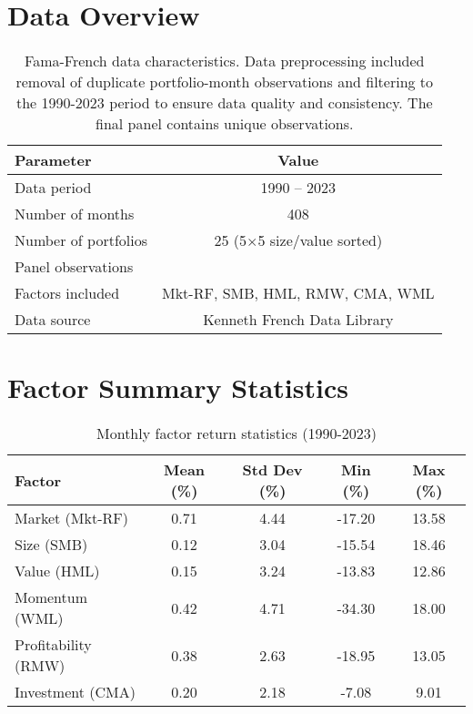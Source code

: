 \section*{Data Overview}
\begin{table}[H]
    \centering
    \caption{Fama-French data characteristics. Data preprocessing included removal of duplicate portfolio-month observations and filtering to the 1990-2023 period to ensure data quality and consistency. The final panel contains \RealTotalObservations{} unique observations.}
    \begin{tabular}{|l|c|}
        \hline
        \textbf{Parameter} & \textbf{Value} \\
        \hline
        Data period & 1990 -- 2023 \\
        Number of months & 408 \\
        Number of portfolios & 25 (5$\times$5 size/value sorted) \\
        Panel observations & \RealTotalObservations{} \\
        Factors included & Mkt-RF, SMB, HML, RMW, CMA, WML \\
        Data source & Kenneth French Data Library\cite{FrenchData2024} \\
        \hline
    \end{tabular}
\end{table}

\section*{Factor Summary Statistics}
\begin{table}[H]
    \centering
    \caption{Monthly factor return statistics (1990-2023)}
    \begin{tabular}{|l|c|c|c|c|}
        \hline
        \textbf{Factor} & \textbf{Mean (\%)} & \textbf{Std Dev (\%)} & \textbf{Min (\%)} & \textbf{Max (\%)} \\
        \hline
        Market (Mkt-RF) & 0.71 & 4.44 & -17.20 & 13.58 \\
        Size (SMB)      & 0.12 & 3.04 & -15.54 & 18.46 \\
        Value (HML)     & 0.15 & 3.24 & -13.83 & 12.86 \\
        Momentum (WML)  & 0.42 & 4.71 & -34.30 & 18.00 \\
        Profitability (RMW) & 0.38 & 2.63 & -18.95 & 13.05 \\
        Investment (CMA)    & 0.20 & 2.18 & -7.08  & 9.01 \\
        \hline
    \end{tabular}
\end{table}


